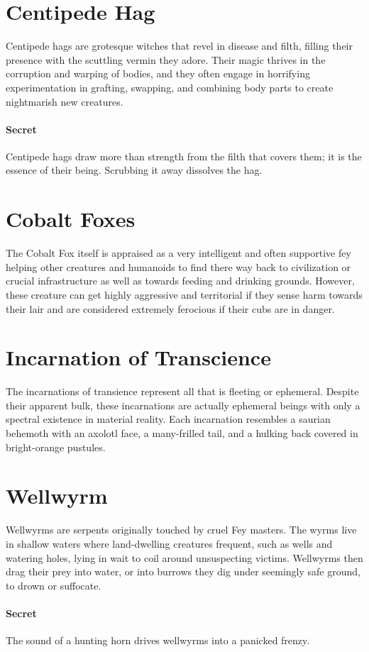 \documentclass[letterpaper,openany,oneside,twocolumn]{book}
\begin{document}
\section*{Centipede Hag}
{\entryfont Centipede hags are grotesque witches that revel in disease and filth, filling their presence with the scuttling vermin they adore. Their magic thrives in the corruption and warping of bodies, and they often engage in horrifying experimentation in grafting, swapping, and combining body parts to create nightmarish new creatures.

\paragraph*{Secret} Centipede hags draw more than strength from the filth that covers them; it is the essence of their being. Scrubbing it away dissolves the hag.}

\section*{Cobalt Foxes}
{\entryfont The Cobalt Fox itself is appraised as a very intelligent and often supportive fey helping other creatures and humanoids to find there way back to civilization or crucial infrastructure as well as towards feeding and drinking grounds. However, these creature can get highly aggressive and territorial if they sense harm towards their lair and are considered extremely ferocious if their cubs are in danger.}

\section*{\LARGE Incarnation of Transcience}
{\entryfont The incarnations of transience represent all that is fleeting or ephemeral. Despite their apparent bulk, these incarnations are actually ephemeral beings with only a spectral existence in material reality. Each incarnation resembles a saurian behemoth with an axolotl face, a many-frilled tail, and a hulking back covered in bright-orange pustules.}

\section*{Wellwyrm}
{\entryfont Wellwyrms are serpents originally touched by cruel Fey masters. The wyrms live in shallow waters where land-dwelling creatures frequent, such as wells and watering holes, lying in wait to coil around unsuspecting victims. Wellwyrms then drag their prey into water, or into burrows they dig under seemingly safe ground, to drown or suffocate.

\paragraph*{Secret} The sound of a hunting horn drives wellwyrms into a panicked frenzy.}
\end{document}
